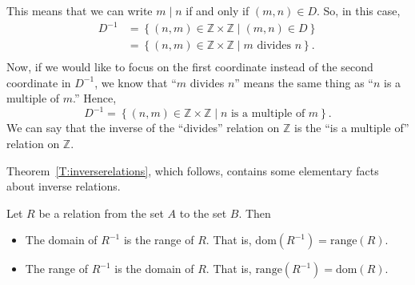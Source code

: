\begin{enumerate}
\[\]
This means that we can write
$m \mid n$ if and only if $\left( {m, n} \right) \in D$.
So, in this case,
\[
\begin{aligned}
D^{ - 1}  &= \left\{ { {\left( {n, m} \right) \in \mathbb{Z} \times \mathbb{Z} } \mid \left( {m, n} \right) \in D} \right\} \\ 
          &= \left\{ { {\left( {n, m} \right) \in \mathbb{Z} \times \mathbb{Z} } \mid m\text{  divides  }n} \right\}\!. \\ 
\end{aligned}
\]
Now, if we would like to focus on the first coordinate instead of the second coordinate in  
$D^{ - 1} $, we know that  ``$m$  divides  $n$''  means the same thing as  ``$n$  is a multiple of  $m$.''  Hence,
\[
D^{ - 1}  = \left\{ { {\left( {n, m} \right) \in \mathbb{Z} \times \mathbb{Z} } \mid n\text{  is a multiple of  }m} \right\}\!.
\]
We can say that the inverse of the ``divides'' relation on  $\mathbb{Z}$  is the ``is a multiple of'' relation on  $\mathbb{Z}$.

Theorem~\ref{T:inverserelations}, which follows, contains some elementary facts about inverse relations.  %
%
\begin{theorem} \label{T:inverserelations}
Let  $R$  be a relation from the set  $A$  to the set  $B$.  Then

\begin{itemize}
\item The domain of  $R^{ - 1} $ is the range of  $R$.  That is, 
$\text{dom}\!\left( {R^{ - 1} } \right) = \text{range}( R )$.  \label{T:inverserelations1}

\item The range of  $R^{ - 1} $  is the domain of  $R$.   That is, 
$\text{range}\!\left( {R^{ - 1} } \right) = \text{dom}( R )$.  \label{T:inverserelations2}


\end{itemize}
\end{theorem}
\end{enumerate}
